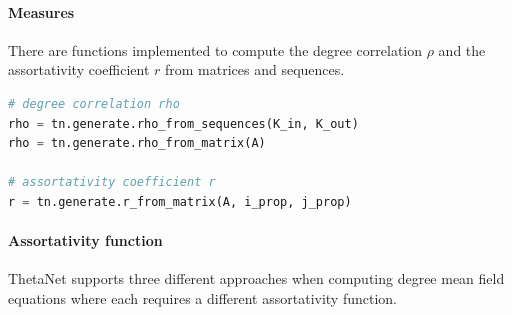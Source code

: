 \documentclass[bibliography=totoc, twoside]{article}
\numberwithin{equation}{section}
\begin{document}
\paragraph*{Measures}
There are functions implemented to compute the degree correlation $\rho$ and the assortativity coefficient $r$ from matrices and sequences.
\begin{lstlisting}[language=python]
# degree correlation rho
rho = tn.generate.rho_from_sequences(K_in, K_out)
rho = tn.generate.rho_from_matrix(A)

# assortativity coefficient r
r = tn.generate.r_from_matrix(A, i_prop, j_prop)
\end{lstlisting}

\paragraph*{Assortativity function}
ThetaNet supports three different approaches when computing degree mean field equations where each requires a different assortativity function.
\end{document}
